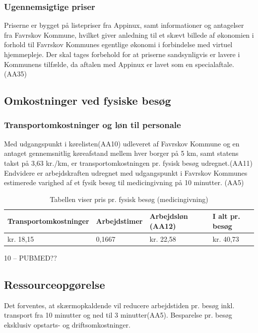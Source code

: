\subsubsection{Ugennemsigtige priser}
Priserne er bygget på listepriser fra Appinux, samt informationer og antagelser fra Favrskov Kommune, hvilket giver anledning til et skævt billede af økonomien i forhold til Favrskov Kommunes egentlige økonomi i forbindelse med virtuel hjemmepleje. Der skal tages forbehold for at priserne sandsynligvis er lavere i Kommunens tilfælde, da aftalen med Appinux er lavet som en specialaftale.(AA35)

\subsection{Omkostninger ved fysiske besøg}
\subsubsection{Transportomkostninger og løn til personale}
Med udgangspunkt i kørelisten(AA10) udleveret af Favrskov Kommune og en antaget gennemsnitlig køreafstand mellem hver borger på 5 km, samt statens takst på 3,63 kr./km, er transportomkostningen pr. fysisk besøg udregnet.(AA11)
Endvidere er arbejdskraften udregnet med udgangspunkt i Favrskov Kommunes estimerede varighed af et fysik besøg til medicingivning på 10 minutter. (AA5)

\begin{table}[H]
	\caption{Tabellen viser pris pr. fysisk besøg (medicingivning)}
	\centering
	\label{tab:tabelfysiskbes}
	\begin{tabular}{|l|l|l|l|}
		\hline
		\textbf{Transportomkostninger} & \textbf{Arbejdstimer } & \textbf{Arbejdsløn (AA12)} & \textbf{I alt pr. besøg}\\ \hline
		kr. 18,15 & 0,1667 & kr. 22,58 & kr. 40,73\\ \hline
	\end{tabular}
\end{table}

10 – PUBMED??

\subsection{Ressourceopgørelse}
Det forventes, at skærmopkaldende vil reducere arbejdstiden pr. besøg inkl. transport fra 10 minutter og ned til 3 minutter(AA5).  
Besparelse pr. besøg eksklusiv opstarts- og driftsomkostninger.

